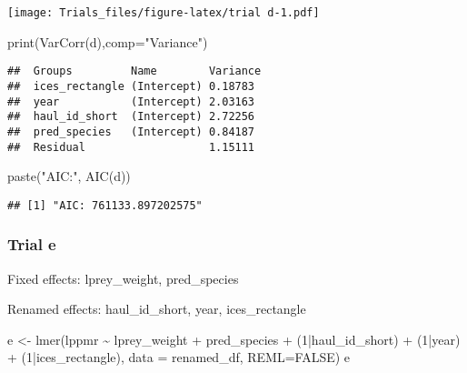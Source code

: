 \documentclass[
]{article}
\newenvironment{Shaded}{\begin{snugshade}}{\end{snugshade}}
\newcommand{\AttributeTok}[1]{\textcolor[rgb]{0.77,0.63,0.00}{#1}}
\newcommand{\ConstantTok}[1]{\textcolor[rgb]{0.00,0.00,0.00}{#1}}
\newcommand{\DecValTok}[1]{\textcolor[rgb]{0.00,0.00,0.81}{#1}}
\newcommand{\FunctionTok}[1]{\textcolor[rgb]{0.00,0.00,0.00}{#1}}
\newcommand{\NormalTok}[1]{#1}
\newcommand{\OtherTok}[1]{\textcolor[rgb]{0.56,0.35,0.01}{#1}}
\newcommand{\SpecialCharTok}[1]{\textcolor[rgb]{0.00,0.00,0.00}{#1}}
\newcommand{\StringTok}[1]{\textcolor[rgb]{0.31,0.60,0.02}{#1}}
\begin{document}
\texttt{[image: Trials\_files/figure-latex/trial d-1.pdf]}

\begin{Shaded}
\begin{Highlighting}[]
\FunctionTok{print}\NormalTok{(}\FunctionTok{VarCorr}\NormalTok{(d),}\AttributeTok{comp=}\StringTok{"Variance"}\NormalTok{)}
\end{Highlighting}
\end{Shaded}

\begin{verbatim}
##  Groups         Name        Variance
##  ices_rectangle (Intercept) 0.18783 
##  year           (Intercept) 2.03163 
##  haul_id_short  (Intercept) 2.72256 
##  pred_species   (Intercept) 0.84187 
##  Residual                   1.15111
\end{verbatim}

\begin{Shaded}
\begin{Highlighting}[]
\FunctionTok{paste}\NormalTok{(}\StringTok{"AIC:"}\NormalTok{, }\FunctionTok{AIC}\NormalTok{(d))}
\end{Highlighting}
\end{Shaded}

\begin{verbatim}
## [1] "AIC: 761133.897202575"
\end{verbatim}

\hypertarget{trial-e}{%
\subsubsection{Trial e}\label{trial-e}}

Fixed effects: lprey\_weight, pred\_species

Renamed effects: haul\_id\_short, year, ices\_rectangle

\begin{Shaded}
\begin{Highlighting}[]
\NormalTok{e }\OtherTok{\textless{}{-}} \FunctionTok{lmer}\NormalTok{(lppmr }\SpecialCharTok{\textasciitilde{}}\NormalTok{ lprey\_weight }\SpecialCharTok{+}\NormalTok{ pred\_species }\SpecialCharTok{+}\NormalTok{ (}\DecValTok{1}\SpecialCharTok{|}\NormalTok{haul\_id\_short) }\SpecialCharTok{+}\NormalTok{ (}\DecValTok{1}\SpecialCharTok{|}\NormalTok{year) }\SpecialCharTok{+}\NormalTok{ (}\DecValTok{1}\SpecialCharTok{|}\NormalTok{ices\_rectangle), }\AttributeTok{data =}\NormalTok{ renamed\_df, }\AttributeTok{REML=}\ConstantTok{FALSE}\NormalTok{)}
\NormalTok{e}
\end{Highlighting}
\end{Shaded}
\end{document}
